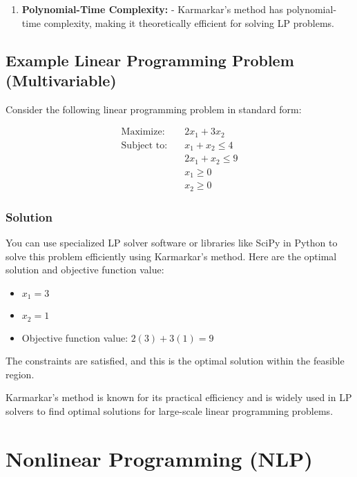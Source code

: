 \documentclass[a4paper]{article}
\begin{document}
\begin{enumerate}
\item \textbf{Polynomial-Time Complexity:}
   - Karmarkar's method has polynomial-time complexity, making it theoretically efficient for solving LP problems.
\end{enumerate}

\subsection{Example Linear Programming Problem (Multivariable)}

Consider the following linear programming problem in standard form:

\begin{align*}
\text{Maximize:} \quad & 2x_1 + 3x_2 \\
\text{Subject to:} \quad & x_1 + x_2 \leq 4 \\
& 2x_1 + x_2 \leq 9 \\
& x_1 \geq 0 \\
& x_2 \geq 0
\end{align*}

\subsubsection{Solution}

You can use specialized LP solver software or libraries like SciPy in Python to solve this problem efficiently using Karmarkar's method. Here are the optimal solution and objective function value:

\begin{itemize}
\item \(x_1 = 3\)
\item \(x_2 = 1\)
\item Objective function value: \(2(3) + 3(1) = 9\)
\end{itemize}

The constraints are satisfied, and this is the optimal solution within the feasible region.

Karmarkar's method is known for its practical efficiency and is widely used in LP solvers to find optimal solutions for large-scale linear programming problems.



\section{Nonlinear Programming (NLP)}
\end{document}

